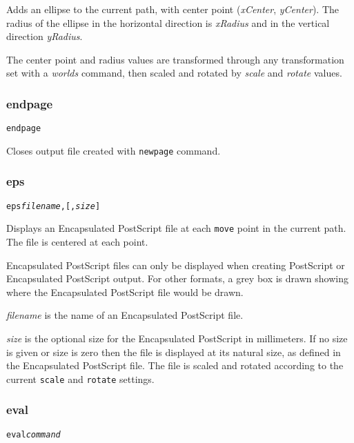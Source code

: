 Adds an ellipse to the current path, with center
point (\textit{xCenter}, \textit{yCenter}).  The radius of the ellipse
in the horizontal direction is \textit{xRadius} and in the vertical
direction \textit{yRadius}.

The center point and radius values are transformed through any
transformation set with a \textit{worlds} command,
then scaled and rotated by \textit{scale}
and \textit{rotate} values.

\subsubsection{endpage}

\begin{alltt}
endpage
\end{alltt}

Closes output file created with \texttt{newpage} command.

\subsubsection{eps}

\begin{alltt}
eps \textit{filename}, [, \textit{size}]
\end{alltt}

Displays an Encapsulated PostScript file at each \texttt{move} point in
the current path.  The file is centered at each point.

Encapsulated PostScript files can only be displayed when creating
PostScript or Encapsulated PostScript output.  For other formats,
a grey box is drawn showing where the Encapsulated PostScript file
would be drawn.

\textit{filename} is the name of an Encapsulated PostScript file.

\textit{size} is the optional size for the Encapsulated PostScript
in millimeters.  If no size
is given or size is zero then the file is displayed at its natural size,
as defined in the Encapsulated PostScript file.
The file is scaled and rotated according to the current \texttt{scale}
and \texttt{rotate} settings.

\subsubsection{eval}

\begin{alltt}
eval \textit{command}
\end{alltt}

